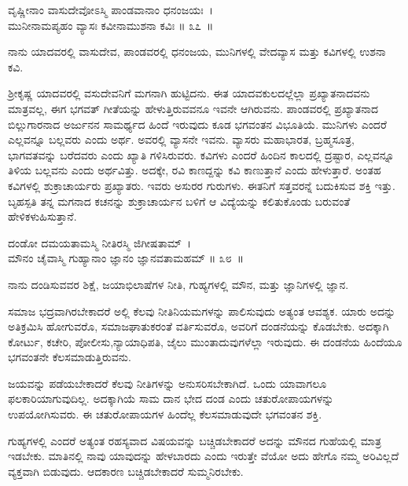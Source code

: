 \begin{shloka}
ವೃಷ್ಣೀನಾಂ ವಾಸುದೇವೋಽಸ್ಮಿ ಪಾಂಡವಾನಾಂ ಧನಂಜಯಃ~।\\ಮುನೀನಾಮಪ್ಯಹಂ ವ್ಯಾಸಃ ಕವೀನಾಮುಶನಾ ಕವಿಃ \hfill॥ ೩೭~॥
\end{shloka}

\begin{artha}
ನಾನು ಯಾದವರಲ್ಲಿ ವಾಸುದೇವ, ಪಾಂಡವರಲ್ಲಿ ಧನಂಜಯ, ಮುನಿಗಳಲ್ಲಿ ವೇದವ್ಯಾಸ ಮತ್ತು ಕವಿಗಳಲ್ಲಿ ಉಶನಾ ಕವಿ.
\end{artha}

ಶ‍್ರೀಕೃಷ್ಣ ಯಾದವರಲ್ಲಿ ವಸುದೇವನಿಗೆ ಮಗನಾಗಿ ಹುಟ್ಟಿದನು. ಈತ ಯಾದವಕುಲದಲ್ಲೆಲ್ಲಾ ಪ್ರಖ್ಯಾತನಾದವನು ಮಾತ್ರವಲ್ಲ, ಈಗ ಭಗವತ್ ಗೀತೆಯನ್ನು ಹೇಳುತ್ತಿರುವವನೂ ಇವನೇ ಆಗಿರುವನು. ಪಾಂಡವರಲ್ಲಿ ಪ್ರಖ್ಯಾತನಾದ ಬಿಲ್ಲುಗಾರನಾದ ಅರ್ಜುನನ ಸಾಮರ್ಥ್ಯದ ಹಿಂದೆ ಇರುವುದು ಕೂಡ ಭಗವಂತನ ವಿಭೂತಿಯೆ. ಮುನಿಗಳು ಎಂದರೆ ಎಲ್ಲವನ್ನೂ ಬಲ್ಲವರು ಎಂದು ಅರ್ಥ. ಅವರಲ್ಲಿ ವ್ಯಾಸನೇ ಇವನು. ವ್ಯಾಸರು ಮಹಾಭಾರತ, ಬ್ರಹ್ಮಸೂತ್ರ, ಭಾಗವತವನ್ನು ಬರೆದವರು ಎಂದು ಖ್ಯಾತಿ ಗಳಿಸಿರುವರು. ಕವಿಗಳು ಎಂದರೆ ಹಿಂದಿನ ಕಾಲದಲ್ಲಿ ದ್ರಷ್ಟಾರ, ಎಲ್ಲವನ್ನೂ ತಿಳಿಯ ಬಲ್ಲವನು ಎಂದು ಅರ್ಥವಿತ್ತು. ಅದಕ್ಕೇ, ರವಿ ಕಾಣದ್ದನ್ನು ಕವಿ ಕಾಣುತ್ತಾನೆ ಎಂದು ಹೇಳುತ್ತಾರೆ. ಅಂತಹ ಕವಿಗಳಲ್ಲಿ ಶುಕ್ರಾಚಾರ್ಯರು ಪ್ರಖ್ಯಾತರು. ಇವರು ಅಸುರರ ಗುರುಗಳು. ಈತನಿಗೆ ಸತ್ತವರನ್ನೆ ಬದುಕಿಸುವ ಶಕ್ತಿ ಇತ್ತು. ಬೃಹಸ್ಪತಿ ತನ್ನ ಮಗನಾದ ಕಚನನ್ನು ಶುಕ್ರಾಚಾರ್ಯನ ಬಳಿಗೆ ಆ ವಿದ್ಯೆಯನ್ನು ಕಲಿತುಕೊಂಡು ಬರುವಂತೆ ಹೇಳಿಕಳುಹಿಸುತ್ತಾನೆ.

\begin{shloka}
ದಂಡೋ ದಮಯತಾಮಸ್ಮಿ ನೀತಿರಸ್ಮಿ ಜಿಗೀಷತಾಮ್~।\\ಮೌನಂ ಚೈವಾಸ್ಮಿ ಗುಹ್ಯಾನಾಂ ಜ್ಞಾನಂ ಜ್ಞಾನವತಾಮಹಮ್ \hfill॥ ೩೮~॥
\end{shloka}

\begin{artha}
ನಾನು ದಂಡಿಸುವವರ ಶಿಕ್ಷೆ, ಜಯಾಭಿಲಾಷೆಗಳ ನೀತಿ, ಗುಹ್ಯಗಳಲ್ಲಿ ಮೌನ, ಮತ್ತು ಜ್ಞಾನಿಗಳಲ್ಲಿ ಜ್ಞಾನ.
\end{artha}

ಸಮಾಜ ಭದ್ರವಾಗಿರಬೇಕಾದರೆ ಅಲ್ಲಿ ಕೆಲವು ನೀತಿನಿಯಮಗಳನ್ನು ಪಾಲಿಸುವುದು ಅತ್ಯಂತ ಆವಶ್ಯಕ. ಯಾರು ಅದನ್ನು ಅತಿಕ್ರಮಿಸಿ ಹೋಗುವರೊ, ಸಮಾಜಘಾತುಕರಂತೆ ವರ್ತಿಸುವರೊ, ಅವರಿಗೆ ದಂಡನೆಯನ್ನು ಕೊಡಬೇಕು. ಅದಕ್ಕಾಗಿ ಕೋರ್ಟು, ಕಚೇರಿ, ಪೋಲೀಸು,\break ನ್ಯಾಯಾಧಿ\-ಪತಿ, ಜೈಲು ಮುಂತಾದುವುಗಳೆಲ್ಲಾ ಇರುವುದು. ಈ ದಂಡನೆಯ ಹಿಂದೆಯೂ ಭಗವಂತನೇ ಕೆಲಸಮಾಡುತ್ತಿರುವನು.

ಜಯವನ್ನು ಪಡೆಯಬೇಕಾದರೆ ಕೆಲವು ನೀತಿಗಳನ್ನು ಅನುಸರಿಸಬೇಕಾಗಿದೆ. ಒಂದು ಯಾವಾ\-ಗಲೂ ಫಲಕಾರಿಯಾಗುವುದಿಲ್ಲ. ಅದಕ್ಕಾಗಿಯೆ ಸಾಮ ದಾನ ಭೇದ ದಂಡ ಎಂದು ಚತುರೋ\-ಪಾಯಗಳನ್ನು ಉಪಯೋಗಿಸುವರು. ಈ ಚತುರೋಪಾಯಗಳ ಹಿಂದೆಲ್ಲ ಕೆಲಸಮಾಡುವುದೇ ಭಗವಂತನ ಶಕ್ತಿ.

ಗುಹ್ಯಗಳಲ್ಲಿ ಎಂದರೆ ಅತ್ಯಂತ ರಹಸ್ಯವಾದ ವಿಷಯವನ್ನು ಬಚ್ಚಿಡಬೇಕಾದರೆ ಅದನ್ನು ಮೌನದ ಗುಹೆಯಲ್ಲಿ ಮಾತ್ರ ಇಡಬೇಕು. ಮಾತಿನಲ್ಲಿ ನಾವು ಯಾವುದನ್ನು ಹೇಳಬಾರದು ಎಂದು ಇರುತ್ತೇ ವೆಯೋ ಅದು ಹೇಗೊ ನಮ್ಮ ಅರಿವಿಲ್ಲದೆ ವ್ಯಕ್ತವಾಗಿ ಬಿಡುವುದು. ಆದಕಾರಣ ಬಚ್ಚಿಡಬೇಕಾದರೆ ಸುಮ್ಮನಿರಬೇಕು.


